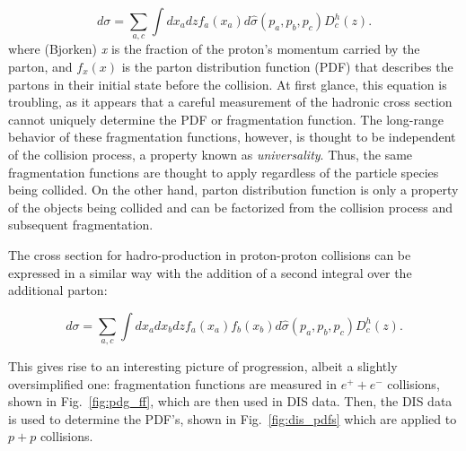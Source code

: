   \begin{equation}
    d\sigma= \sum_{a,c} \int dx_a dz f_a(x_a) d\hat{\sigma}(p_a,p_b,p_c) D_c^h(z).
    \label{sidis_cross_section}
  \end{equation}
where (Bjorken) \textit{x} is the fraction of the proton’s momentum carried by the parton, and $f_x(x)$ is the parton distribution function (PDF) that describes the partons in their initial state before the collision. At first glance, this equation is troubling, as it appears that a careful measurement of the hadronic cross section cannot uniquely determine the PDF or fragmentation function. The long-range behavior of these fragmentation functions, however, is thought to be independent of the collision process, a property known as \textit{universality}. Thus, the same fragmentation functions are thought to apply regardless of the particle species being collided. On the other hand, parton distribution function is only a property of the objects being collided and can be factorized from the collision process and subsequent fragmentation. 
 
  The cross section for hadro-production in proton-proton collisions can be expressed in a similar way with the addition of a second integral over the additional parton:

  \begin{equation}
    d\sigma= \sum_{a,c} \int dx_a dx_b dz f_a(x_a) f_b(x_b) d\hat{\sigma}(p_a,p_b,p_c) D_c^h(z).
    \label{p+p_sidis}
  \end{equation}

  This gives rise to an interesting picture of progression, albeit a slightly oversimplified one: fragmentation functions are measured in $e^+ + e^-$ collisions, shown in Fig.~\ref{fig:pdg_ff}, which are then used in DIS data. Then, the DIS data is used to determine the PDF's, shown in Fig.~\ref{fig:dis_pdfs} which are applied to $p+p$ collisions.

